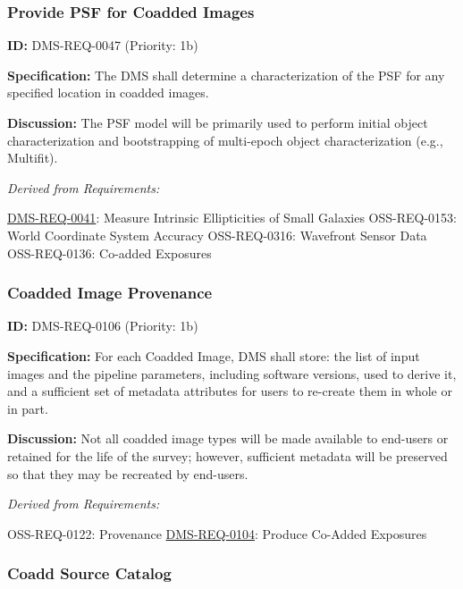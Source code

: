 \documentclass[SE,toc,lsstdraft]{lsstdoc}
\begin{document}
\subsubsection{Provide PSF for Coadded Images}

\label{DMS-REQ-0047}
\textbf{ID:} DMS-REQ-0047 (Priority: 1b)

\textbf{Specification:} The DMS shall determine a characterization of the PSF for any specified location in coadded images.

\textbf{Discussion:} The PSF model will be primarily used to perform initial object characterization and bootstrapping of multi-epoch object characterization (e.g., Multifit).

\emph{Derived from Requirements:}

\hyperref[DMS-REQ-0041]{DMS-REQ-0041}:
Measure Intrinsic Ellipticities of Small Galaxies \newline
OSS-REQ-0153:
World Coordinate System Accuracy \newline
OSS-REQ-0316:
Wavefront Sensor Data \newline
OSS-REQ-0136:
Co-added Exposures \newline

\subsubsection{Coadded Image Provenance}

\label{DMS-REQ-0106}
\textbf{ID:} DMS-REQ-0106 (Priority: 1b)

\textbf{Specification:} For each Coadded Image, DMS shall store: the list of input images and the pipeline parameters, including software versions, used to derive it, and a sufficient set of metadata attributes for users to re-create them in whole or in part.

\textbf{Discussion:} Not all coadded image types will be made available to end-users or retained for the life of the survey; however, sufficient metadata will be preserved so that they may be recreated by end-users.

\emph{Derived from Requirements:}

OSS-REQ-0122:
Provenance \newline
\hyperref[DMS-REQ-0104]{DMS-REQ-0104}:
Produce Co-Added Exposures \newline

\subsubsection{Coadd Source Catalog}
\end{document}
